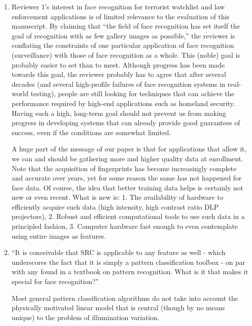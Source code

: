 \documentclass[11pt]{article}
\begin{document}
\begin{enumerate}
\item Reviewer 1's interest in face recognition for terrorist watchlist and law
enforcement applications is of limited relevance to the evaluation of this
manuscript.  By claiming that ``the field of face recognition has set itself the
goal of recognition with as few gallery images as possible,'' the reviewer is
conflating the constraints of one particular application of face recognition
(surveillance) with those of face recognition as a whole. This (noble) goal is probably easier to
set than to meet. Although progress has been made towards this goal, the reviewer
probably has to agree that after several decades (and several high-profile failures of
face recognition systems in real-world testing), people are still looking for techniques
that can achieve the performance required by high-end applications such as homeland
security. Having such a high, long-term goal should not prevent us from making progress in developing systems that
can already provide good guarantees of success, even if the conditions are somewhat limited.

A huge part of the message of our paper is that for applications that allow it,
we can and should be gathering more and higher quality data at enrollment.
Note that the acquisition of fingerprints has become increasingly complete and
accurate over years, yet for some reason the same has not happened for face
data.  Of course, the idea that better training data helps is certainly not new
or even recent.  What is new is: 1.  The availability of hardware to
efficiently acquire such data (high intensity, high contrast ratio DLP
projectors), 2.  Robust and efficient computational tools to use such data in a
principled fashion, 3. Computer hardware fast enough to even contemplate using
entire images as features. 

\item ``It is conceivable that SRC is applicable to any feature as well - which
underscores the fact that it is simply a pattern classification toolbox - on
par with any found in a textbook on pattern recognition. What is it that makes
it special for face recognition?''

Most general pattern classification algorithms do not take into account the
physically motivated linear model that is central (though by no means unique)
to the problem of illumination variation.


\end{enumerate}
\end{document}
